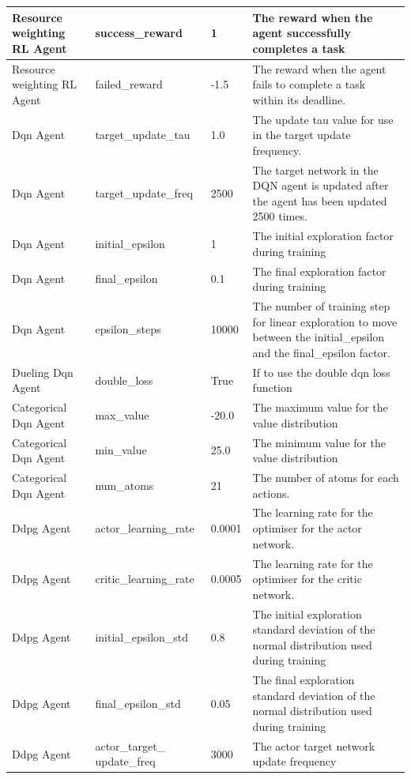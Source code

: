 \begin{longtable}{|p{2cm}|p{3.5cm}|p{2.5cm}|p{6cm}|}
        Resource weighting RL Agent & success\_reward & 1 & The reward when the agent successfully completes a task
            \\ \hline
        Resource weighting RL Agent & failed\_reward & -1.5 & The reward when the agent fails to complete a task within
            its deadline. \\ \hline
        Dqn Agent & target\_update\_tau & 1.0 & The update tau value for use in the target update frequency. \\ \hline
        Dqn Agent & target\_update\_freq & 2500 & The target network in the DQN agent is updated after the agent
            has been updated 2500 times. \\ \hline
        Dqn Agent & initial\_epsilon & 1 & The initial exploration factor during training \\ \hline
        Dqn Agent & final\_epsilon & 0.1 & The final exploration factor during training \\ \hline
        Dqn Agent & epsilon\_steps & 10000 & The number of training step for linear exploration to move between the
            initial\_epsilon and the final\_epsilon factor. \\ \hline
        Dueling Dqn Agent & double\_loss & True & If to use the double dqn loss function \\ \hline
        Categorical Dqn Agent & max\_value & -20.0 & The maximum value for the value distribution \\ \hline
        Categorical Dqn Agent & min\_value & 25.0 & The minimum value for the value distribution \\ \hline
        Categorical Dqn Agent & num\_atoms & 21 & The number of atoms for each actions. \\ \hline
        Ddpg Agent & actor\_learning\_rate & 0.0001 & The learning rate for the optimiser for the actor network. \\ \hline
        Ddpg Agent & critic\_learning\_rate & 0.0005 & The learning rate for the optimiser for the critic network. \\ \hline
        Ddpg Agent & initial\_epsilon\_std & 0.8 & The initial exploration standard deviation of the normal distribution
            used  during training \\ \hline
        Ddpg Agent & final\_epsilon\_std & 0.05 & The final exploration standard deviation of the normal distribution
            used  during training \\ \hline
        Ddpg Agent & actor\_target\_ update\_freq & 3000 & The actor target network update frequency \\ \hline

\end{longtable}
